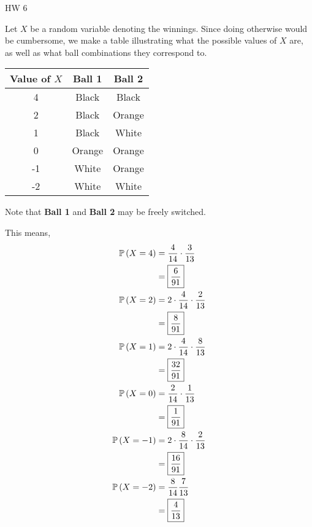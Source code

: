 \documentclass{article}
\begin{document}
\begin{center}
  \Large HW 6
\end{center}

\problem{}

Let $X$ be a random variable denoting the winnings.
Since doing otherwise would be cumbersome,
we make a table illustrating what the possible values of $X$ are,
as well as what ball combinations they correspond to.

\begin{center}
  \begin{tabular}{ |c|c|c| } 
    \hline
    \textbf{Value of $X$} & \textbf{Ball 1} & \textbf{Ball 2} \\ 
    \hline
    4 & Black & Black \\
    2 & Black & Orange \\
    1 & Black & White \\
    0 & Orange & Orange \\
    -1 & White & Orange \\
    -2 & White & White \\
    \hline
  \end{tabular}
\end{center}

Note that \textbf{Ball 1} and \textbf{Ball 2} may be freely switched.

This means,
\begin{align*}
  \mathbb{P} \left ( X = 4 \right) &= \frac{4}{14} \cdot \frac{3}{13} \\
             &= \boxed{\frac{6}{91}} \\
  \mathbb{P} \left ( X = 2 \right) &= 2 \cdot \frac{4}{14} \cdot \frac{2}{13} \\
             &= \boxed{\frac{8}{91}} \\
  \mathbb{P} \left ( X = 1 \right) &= 2 \cdot \frac{4}{14} \cdot \frac{8}{13} \\
             &= \boxed{\frac{32}{91}} \\
  \mathbb{P} \left ( X = 0 \right) &= \frac{2}{14} \cdot \frac{1}{13} \\
             &= \boxed{\frac{1}{91}} \\
  \mathbb{P} \left ( X = -1 \right) &= 2 \cdot \frac{8}{14} \cdot \frac{2}{13} \\
             &= \boxed{\frac{16}{91}} \\
  \mathbb{P} \left ( X = -2 \right) &= \frac{8}{14} \frac{7}{13} \\
             &= \boxed{\frac{4}{13}} \\
\end{align*}
\end{document}
